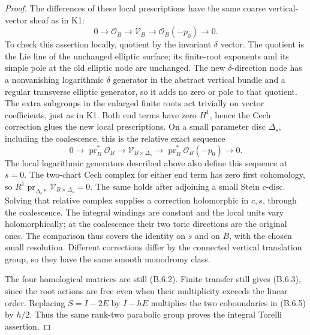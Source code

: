 \begin{proof}
The differences of these local prescriptions have the same
coarse vertical-vector sheaf as in K1:
\[
 0\longrightarrow\mathcal O_B\longrightarrow\mathcal V_B
 \longrightarrow\mathcal O_B(-p_0)\longrightarrow0.
\]
To check this assertion locally, quotient by the invariant
$\delta$ vector. The quotient is the Lie line of the unchanged
elliptic surface; its finite-root exponents and its simple
pole at the old elliptic node are unchanged. The new
$\delta$-direction node has a nonvanishing logarithmic
$\delta$ generator in the abstract vertical bundle and a
regular transverse elliptic generator, so it adds no zero
or pole to that quotient. The extra subgroups in the enlarged
finite roots act trivially on vector coefficients, just as
in K1. Both end terms have zero $H^1$, hence the Cech
correction glues the new local prescriptions. On a small
parameter disc $\Delta_s$, including the coalescence, this is
the relative exact sequence
\[
 0\longrightarrow\operatorname{pr}_B^*\mathcal O_B
 \longrightarrow\mathcal V_{B\times\Delta_s}
 \longrightarrow\operatorname{pr}_B^*\mathcal O_B(-p_0)
 \longrightarrow0.
\]
The local logarithmic generators described above also define
this sequence at $s=0$. The two-chart Cech complex for either
end term has zero first cohomology, so
$R^1\operatorname{pr}_{\Delta_s*}\mathcal V_{B\times\Delta_s}=0$.
The same holds after adjoining a small Stein $c$-disc. Solving
that relative complex supplies a correction holomorphic in
$c,s$, through the coalescence. The integral windings are constant
and the local units vary holomorphically; at the coalescence
their two toric directions are the original ones. The
comparison thus covers the identity on $s$ and on $B$, with
the chosen small resolution. Different corrections differ
by the connected vertical translation group, so they have
the same smooth monodromy class.

The four homological matrices are still (B.6.2). Finite transfer
still gives (B.6.3), since the root actions are free even when
their multiplicity exceeds the linear order. Replacing
$S=I-2E$ by $I-hE$ multiplies the two coboundaries in (B.6.5)
by $h/2$. Thus the same rank-two parabolic group proves the
integral Torelli assertion.


\end{proof}
